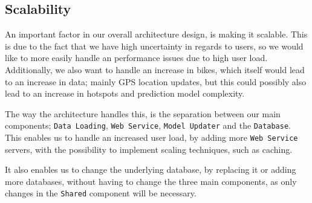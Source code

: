 \subsection{Scalability}
An important factor in our overall architecture design, is making it scalable.
This is due to the fact that we have high uncertainty in regards to users, so we would like to more easily handle an performance issues due to high user load.
Additionally, we also want to handle an increase in bikes, which itself would lead to an increase in data; mainly GPS location updates, but this could possibly also lead to an increase in hotspots and prediction model complexity.

The way the architecture handles this, is the separation between our main components; \texttt{Data Loading}, \texttt{Web Service}, \texttt{Model Updater} and the \texttt{Database}.
This enables us to handle an increased user load, by adding more \texttt{Web Service} servers, with the possibility to implement scaling techniques, such as caching.\cite{scalability}

It also enables us to change the underlying database, by replacing it or adding more databases, without having to change the three main components, as only changes in the \texttt{Shared} component will be necessary.
